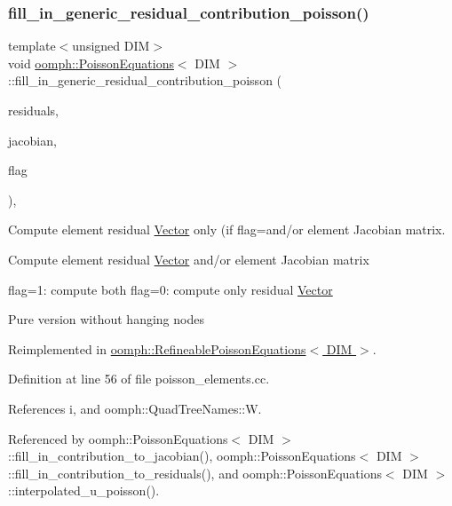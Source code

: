 \subsubsection{\texorpdfstring{fill\+\_\+in\+\_\+generic\+\_\+residual\+\_\+contribution\+\_\+poisson()}{fill\_in\_generic\_residual\_contribution\_poisson()}}
{\footnotesize\ttfamily template$<$unsigned D\+IM$>$ \\
void \hyperlink{classoomph_1_1PoissonEquations}{oomph\+::\+Poisson\+Equations}$<$ D\+IM $>$\+::fill\+\_\+in\+\_\+generic\+\_\+residual\+\_\+contribution\+\_\+poisson (\begin{DoxyParamCaption}\item[{\hyperlink{classoomph_1_1Vector}{Vector}$<$ double $>$ \&}]{residuals,  }\item[{\hyperlink{classoomph_1_1DenseMatrix}{Dense\+Matrix}$<$ double $>$ \&}]{jacobian,  }\item[{const unsigned \&}]{flag }\end{DoxyParamCaption})\hspace{0.3cm}{\ttfamily [protected]}, {\ttfamily [virtual]}}



Compute element residual \hyperlink{classoomph_1_1Vector}{Vector} only (if flag=and/or element Jacobian matrix. 

Compute element residual \hyperlink{classoomph_1_1Vector}{Vector} and/or element Jacobian matrix

flag=1\+: compute both flag=0\+: compute only residual \hyperlink{classoomph_1_1Vector}{Vector}

Pure version without hanging nodes 

Reimplemented in \hyperlink{classoomph_1_1RefineablePoissonEquations_a1cea3422561cd3016aa4cc04c0e5be56}{oomph\+::\+Refineable\+Poisson\+Equations$<$ D\+I\+M $>$}.



Definition at line 56 of file poisson\+\_\+elements.\+cc.



References i, and oomph\+::\+Quad\+Tree\+Names\+::W.



Referenced by oomph\+::\+Poisson\+Equations$<$ D\+I\+M $>$\+::fill\+\_\+in\+\_\+contribution\+\_\+to\+\_\+jacobian(), oomph\+::\+Poisson\+Equations$<$ D\+I\+M $>$\+::fill\+\_\+in\+\_\+contribution\+\_\+to\+\_\+residuals(), and oomph\+::\+Poisson\+Equations$<$ D\+I\+M $>$\+::interpolated\+\_\+u\+\_\+poisson().

